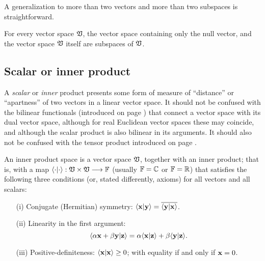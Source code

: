 A generalization to more than two vectors and more than two subspaces is straightforward.


For every vector space ${\frak V}$, the vector space containing only the null vector,
 and the vector space ${\frak V}$ itself are subspaces of ${\frak V}$.

\subsection{Scalar or inner product}
\label{2011-m-scalarproduct}

A {\em scalar} or {\em inner} product presents some form of measure of ``distance'' or ``apartness''
of two vectors in a linear vector space.
It should not be confused with the bilinear functionals (introduced on page \pageref{2011-m-dvs}) that connect a vector space with its dual vector space,
although for real Euclidean vector spaces these may coincide,
and although the scalar product is also bilinear in its arguments.
It should also not be confused with the tensor product introduced on page \pageref{2011-m-tensorp}.

An inner product space is a vector space $\frak V$,
together with an inner product; that is, with a map
 $\langle \cdot \vert \cdot \rangle :  \frak V  \times  \frak V  \longrightarrow {\Bbb F}$
 (usually ${\Bbb F}={\Bbb C}$ or ${\Bbb F}={\Bbb R}$)
 that satisfies the following three conditions (or, stated differently, axioms) for all vectors  and all scalars:
\begin{itemize}
\item[(i)]
Conjugate (Hermitian) symmetry:
$
\langle {\bf x}\vert {\bf y}\rangle
=
\overline{\langle {\bf y}\vert {\bf x}\rangle }$.
\item[(ii)]
Linearity in the first argument:
$$
\langle  \alpha{\bf x} + \beta {\bf y}  \vert {\bf z}\rangle
=
\alpha {\langle {\bf x}\vert {\bf z}\rangle}
+
\beta {\langle {\bf y}\vert {\bf z}\rangle}
.
$$

\item[(iii)]
Positive-definiteness:
$
\langle {\bf x}\vert {\bf x}\rangle
\ge
0$;  with equality if and only if ${\bf x} = 0$.
\end{itemize}

